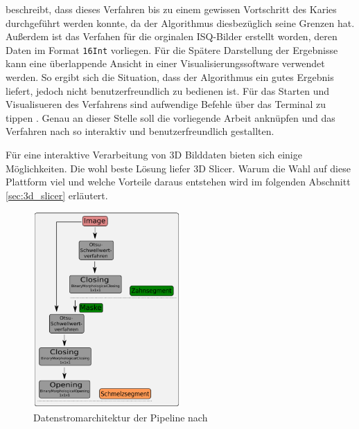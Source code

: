 \citet{hoffmann2020} beschreibt, dass dieses Verfahren bis zu einem gewissen Vortschritt
des Karies durchgeführt werden konnte, da der Algorithmus diesbezüglich seine
Grenzen hat. Außerdem ist das Verfahen für die orginalen ISQ-Bilder erstellt worden,
deren Daten im Format \texttt{16Int} vorliegen. Für die Spätere Darstellung der
Ergebnisse kann eine überlappende Ansicht in einer Visualisierungssoftware
verwendet werden. So ergibt sich die Situation, dass der Algorithmus ein gutes
Ergebnis liefert, jedoch nicht benutzerfreundlich zu bedienen ist. Für das
Starten und Visualisueren des Verfahrens sind aufwendige Befehle über das
Terminal zu tippen \citep[vgl.][Seite 53]{hoffmann2020}. Genau an dieser Stelle soll
die vorliegende Arbeit anknüpfen und das Verfahren nach \citet{hoffmann2020} so
interaktiv und benutzerfreundlich gestallten.

Für eine interaktive Verarbeitung von 3D Bilddaten bieten sich einige
Möglichkeiten. Die wohl beste Lösung liefer 3D Slicer. Warum die Wahl auf diese
Plattform viel und welche Vorteile daraus entstehen wird im folgenden Abschnitt
\ref{sec:3d_slicer} erläutert.

\begin{figure}[h]
	\centering
	\includegraphics[width=0.5\textwidth]{img/pipelineHofmann.png}
	\caption{Datenstromarchitektur der Pipeline nach \citet{hoffmann2020}}
	\label{fig:pipeline}
\end{figure}

\pagebreak

